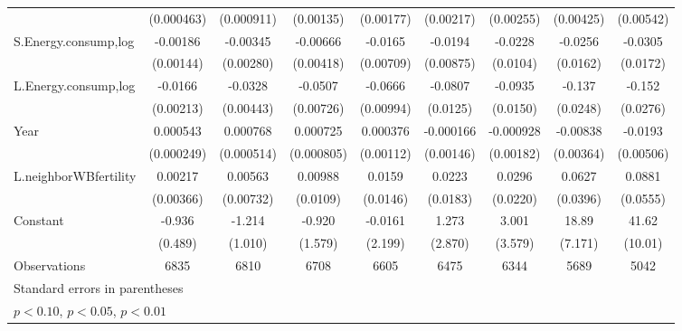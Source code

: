 \begin{table}[htbp]
\begin{tabular}{l*{8}{c}}
                    &  (0.000463)         &  (0.000911)         &   (0.00135)         &   (0.00177)         &   (0.00217)         &   (0.00255)         &   (0.00425)         &   (0.00542)         \\
[1em]
S.Energy.consump,log&    -0.00186         &    -0.00345         &    -0.00666         &     -0.0165\sym{**} &     -0.0194\sym{**} &     -0.0228\sym{**} &     -0.0256         &     -0.0305\sym{*}  \\
                    &   (0.00144)         &   (0.00280)         &   (0.00418)         &   (0.00709)         &   (0.00875)         &    (0.0104)         &    (0.0162)         &    (0.0172)         \\
[1em]
L.Energy.consump,log&     -0.0166\sym{***}&     -0.0328\sym{***}&     -0.0507\sym{***}&     -0.0666\sym{***}&     -0.0807\sym{***}&     -0.0935\sym{***}&      -0.137\sym{***}&      -0.152\sym{***}\\
                    &   (0.00213)         &   (0.00443)         &   (0.00726)         &   (0.00994)         &    (0.0125)         &    (0.0150)         &    (0.0248)         &    (0.0276)         \\
[1em]
Year                &    0.000543\sym{**} &    0.000768         &    0.000725         &    0.000376         &   -0.000166         &   -0.000928         &    -0.00838\sym{**} &     -0.0193\sym{***}\\
                    &  (0.000249)         &  (0.000514)         &  (0.000805)         &   (0.00112)         &   (0.00146)         &   (0.00182)         &   (0.00364)         &   (0.00506)         \\
[1em]
L.neighborWBfertility&     0.00217         &     0.00563         &     0.00988         &      0.0159         &      0.0223         &      0.0296         &      0.0627         &      0.0881         \\
                    &   (0.00366)         &   (0.00732)         &    (0.0109)         &    (0.0146)         &    (0.0183)         &    (0.0220)         &    (0.0396)         &    (0.0555)         \\
[1em]
Constant            &      -0.936\sym{*}  &      -1.214         &      -0.920         &     -0.0161         &       1.273         &       3.001         &       18.89\sym{***}&       41.62\sym{***}\\
                    &     (0.489)         &     (1.010)         &     (1.579)         &     (2.199)         &     (2.870)         &     (3.579)         &     (7.171)         &     (10.01)         \\
\hline
Observations        &        6835         &        6810         &        6708         &        6605         &        6475         &        6344         &        5689         &        5042         \\
\hline\hline
\multicolumn{9}{l}{\footnotesize Standard errors in parentheses}\\
\multicolumn{9}{l}{\footnotesize \sym{*} \(p<0.10\), \sym{**} \(p<0.05\), \sym{***} \(p<0.01\)}\\
\end{tabular}
\end{table}

